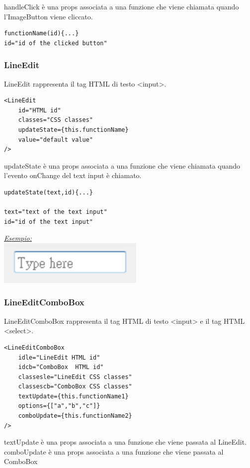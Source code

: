\begin{flushleft}
handleClick è una props associata a una funzione che viene chiamata quando l'ImageButton viene cliccato.

\begin{verbatim}
functionName(id){...}
id="id of the clicked button"
\end{verbatim}

\subsubsection{LineEdit}
LineEdit rappresenta il tag HTML di testo <input>.

\begin{verbatim}
<LineEdit
	id="HTML id"
	classes="CSS classes"
	updateState={this.functionName}
	value="default value"
/>
\end{verbatim}

updateState è una props associata a una funzione che viene chiamata quando l'evento onChange del text input è chiamato.

\begin{verbatim}
updateState(text,id){...}

text="text of the text input"
id="id of the text input"
\end{verbatim}

\begin{center}
\underline{\textit{Esempio:}}
\\
\includegraphics[scale=1]{img/lineedit.png}
\\
\end{center}

\subsubsection{LineEditComboBox}
LineEditComboBox rappresenta il tag HTML di testo <input> e il tag HTML <select>.
\begin{verbatim}
<LineEditComboBox
	idle="LineEdit HTML id"
	idcb="ComboBox  HTML id"
	classesle="LineEdit CSS classes"
	classescb="ComboBox CSS classes"
	textUpdate={this.functionName1}
	options={["a","b","c"]}
	comboUpdate={this.functionName2}
/>
\end{verbatim}

textUpdate è una props associata a una funzione che viene passata al LineEdit.
comboUpdate è una props associata a una funzione che viene passata al ComboBox


\end{flushleft}
